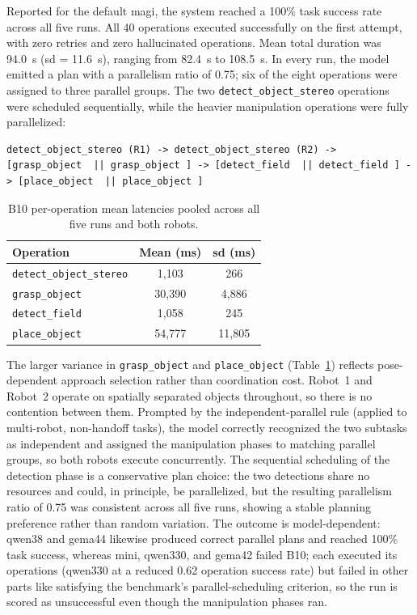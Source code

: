 \documentclass[
     12pt,
     a4paper,
     BCOR=10mm,
     DIV=14,
     listof=totoc,
     bibliography=totoc,
     parskip,
     twoside,
     headsepline
     ]{scrreprt}
\begin{document}
Reported for the default \gls{magi}, the system reached a 100\% task success rate across all five runs. All 40 operations executed successfully on the first attempt, with zero retries and zero hallucinated operations. Mean total duration was 94.0~s (\gls{sd} = 11.6~s), ranging from 82.4~s to 108.5~s. In every run, the model emitted a plan with a parallelism ratio of 0.75; six of the eight operations were assigned to three parallel groups. The two \texttt{detect\_object\_stereo} operations were scheduled sequentially, while the heavier manipulation operations were fully parallelized:

\begin{lstlisting}
detect_object_stereo (R1) -> detect_object_stereo (R2) -> [grasp_object  || grasp_object ] -> [detect_field  || detect_field ] -> [place_object  || place_object ]
\end{lstlisting}

\begin{table}[ht]
	\centering
	\begin{tabular}{lcc}
		\hline
		\textbf{Operation}              & \textbf{Mean (ms)} & \textbf{\gls{sd} (ms)} \\
		\hline
		\texttt{detect\_object\_stereo} & 1{,}103            & 266                    \\
		\texttt{grasp\_object}          & 30{,}390           & 4{,}886                \\
		\texttt{detect\_field}          & 1{,}058            & 245                    \\
		\texttt{place\_object}          & 54{,}777           & 11{,}805               \\
		\hline
	\end{tabular}
	\caption{B10 per-operation mean latencies pooled across all five runs and both robots.}
	\label{tab:b10-latency}
\end{table}

The larger variance in \texttt{grasp\_object} and \texttt{place\_object} (Table~\ref{tab:b10-latency}) reflects pose-dependent approach selection rather than coordination cost. Robot~1 and Robot~2 operate on spatially separated objects throughout, so there is no contention between them. Prompted by the independent-parallel rule (applied to multi-robot, non-handoff tasks), the model correctly recognized the two subtasks as independent and assigned the manipulation phases to matching parallel groups, so both robots execute concurrently. The sequential scheduling of the detection phase is a conservative plan choice: the two detections share no resources and could, in principle, be parallelized, but the resulting parallelism ratio of 0.75 was consistent across all five runs, showing a stable planning preference rather than random variation. The outcome is model-dependent: \gls{qwen38} and \gls{gema44} likewise produced correct parallel plans and reached 100\% task success, whereas \gls{mini}, \gls{qwen330}, and \gls{gema42} failed B10; each executed its operations (\gls{qwen330} at a reduced 0.62 operation success rate) but failed in other parts like satisfying the benchmark's parallel-scheduling criterion, so the run is scored as unsuccessful even though the manipulation phases ran.
\end{document}
